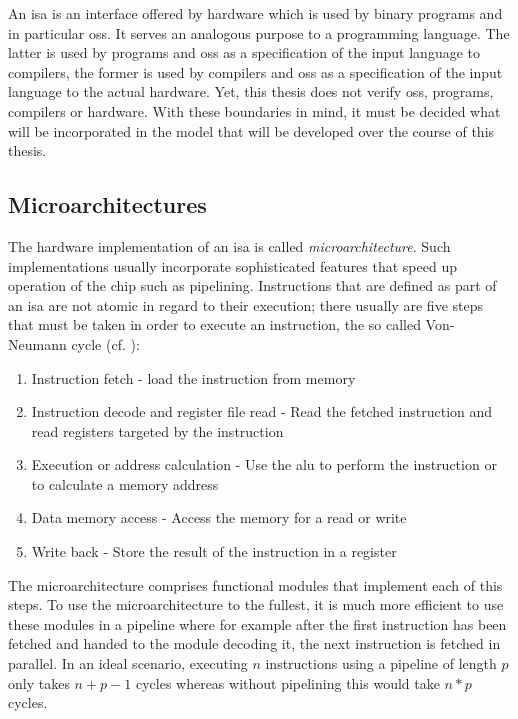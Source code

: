 An \gls{isa} is an interface offered by hardware which is used by binary programs and in particular \glspl{os}.
It serves an analogous purpose to a programming language.
The latter is used by programs and \glspl{os} as a specification of the input language to compilers, the former is used by compilers and \glspl{os} as a specification of the input language to the actual hardware.
Yet, this thesis does not verify \glspl{os}, programs, compilers or hardware.
With these boundaries in mind, it must be decided what will be incorporated in the model that will be developed over the course of this thesis.

\subsection{Microarchitectures}
\label{sec:microarchs}

The hardware implementation of an \gls{isa} is called \textit{microarchitecture}.
Such implementations usually incorporate sophisticated features that speed up operation of the chip such as pipelining.
Instructions that are defined as part of an \gls{isa} are not atomic in regard to their execution; there usually are five steps that must be taken in order to execute an instruction, the so called Von-Neumann cycle (cf. \cite[p.286]{Patterson13}):
\begin{enumerate}
    \item Instruction fetch - load the instruction from memory
    \item Instruction decode and register file read - Read the fetched instruction and read registers targeted by the instruction
    \item Execution or address calculation - Use the \gls{alu} to perform the instruction or to calculate a memory address
    \item Data memory access - Access the memory for a read or write
    \item Write back - Store the result of the instruction in a register
\end{enumerate}
The microarchitecture comprises functional modules that implement each of this steps.
To use the microarchitecture to the fullest, it is much more efficient to use these modules in a pipeline where for example after the first instruction has been fetched and handed to the module decoding it, the next instruction is fetched in parallel.
In an ideal scenario, executing $ n $ instructions using a pipeline of length $ p $ only takes $ n + p - 1 $ cycles whereas without pipelining this would take $ n * p $ cycles.

